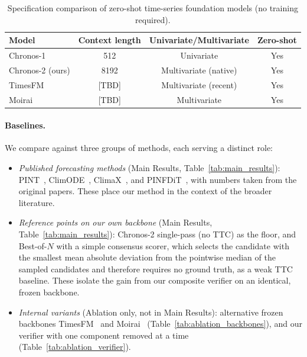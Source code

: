 \documentclass[preprint,12pt]{elsarticle}
\begin{document}
\begin{table}[H]
\centering
\caption{Specification comparison of zero-shot time-series foundation models (no training required). }
\begin{tabular}{lccc}
\toprule
Model & Context length & Univariate/Multivariate & Zero-shot \\
\midrule
Chronos-1        & 512   & Univariate              & Yes \\
Chronos-2 (ours) & 8192  & Multivariate (native)   & Yes \\
TimesFM          & [TBD] & Multivariate (recent)   & Yes \\
Moirai           & [TBD] & Multivariate            & Yes \\
\bottomrule
\end{tabular}
\label{tab:fm_comparison}
\end{table}

\paragraph{Baselines.} %
We compare against three groups of methods, each serving a distinct role:
\begin{itemize}
    \item \textit{Published forecasting methods} (Main Results, Table~\ref{tab:main_results}): PINT~\citep{park2025pint}, ClimODE~\citep{verma2024climode}, ClimaX~\citep{nguyen2023climax}, and PINFDiT~\citep{cao2026pinfdit}, with numbers taken from the original papers. These place our method in the context of the broader literature.
    \item \textit{Reference points on our own backbone} (Main Results, Table~\ref{tab:main_results}): Chronos-2 single-pass (no TTC) as the floor, and Best-of-$N$ with a simple consensus scorer, which selects the candidate with the smallest mean absolute deviation from the pointwise median of the sampled candidates and therefore requires no ground truth, as a weak TTC baseline. These isolate the gain from our composite verifier on an identical, frozen backbone.
    \item \textit{Internal variants} (Ablation only, not in Main Results): alternative frozen backbones TimesFM~\citep{das2024timesfm} and Moirai~\citep{woo2024moirai} (Table~\ref{tab:ablation_backbones}), and our verifier with one component removed at a time (Table~\ref{tab:ablation_verifier}).
\end{itemize}
\end{document}
